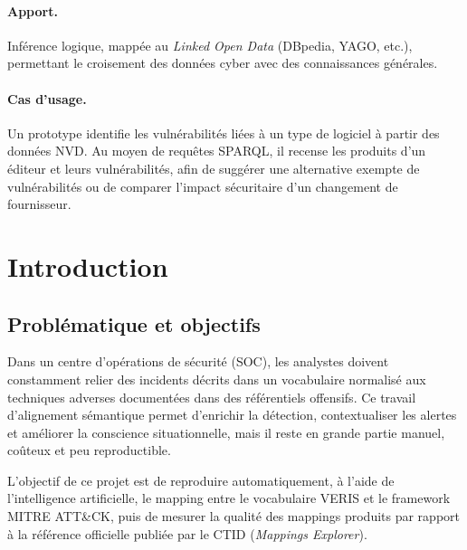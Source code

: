 \documentclass[a4paper,12pt]{article}
\begin{document}
\paragraph{Apport.}
Inférence logique, mappée au \emph{Linked Open Data} (DBpedia, YAGO, etc.),
permettant le croisement des données cyber avec des connaissances générales.

\paragraph{Cas d'usage.}
Un prototype identifie les vulnérabilités liées à un type de logiciel à partir
des données NVD. Au moyen de requêtes SPARQL, il recense les produits d'un
éditeur et leurs vulnérabilités, afin de suggérer une alternative exempte de
vulnérabilités ou de comparer l'impact sécuritaire d'un changement de
fournisseur.

\newpage
\section{Introduction}

\subsection{Problématique et objectifs}

Dans un centre d'opérations de sécurité (SOC), les analystes doivent constamment relier
des incidents décrits dans un vocabulaire normalisé aux techniques adverses documentées
dans des référentiels offensifs. Ce travail d'alignement sémantique permet d'enrichir la détection,
contextualiser les alertes et améliorer la conscience
situationnelle, mais il reste en grande partie manuel, coûteux et peu
reproductible.

L'objectif de ce projet est de reproduire automatiquement, à l'aide de
l'intelligence artificielle, le mapping entre le vocabulaire VERIS et le
framework MITRE ATT\&CK, puis de mesurer la qualité des mappings produits par
rapport à la référence officielle publiée par le CTID (\emph{Mappings Explorer}).
\end{document}
